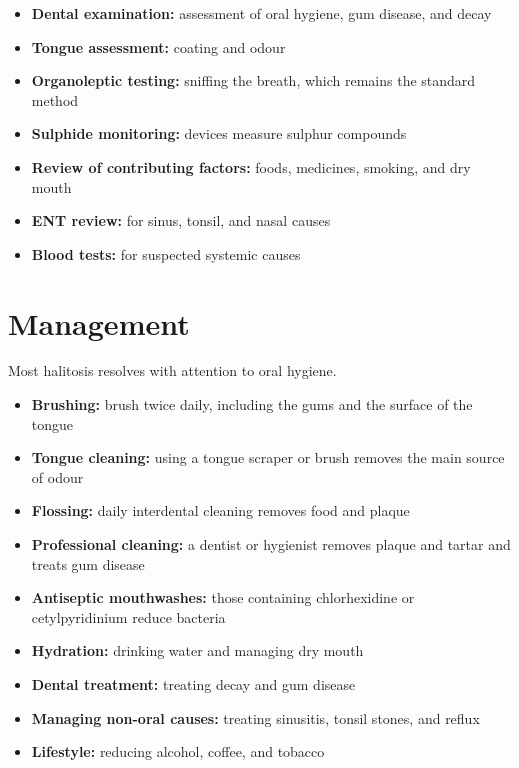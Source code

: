 \begin{itemize}
    \item \textbf{Dental examination:} assessment of oral hygiene, gum disease, and decay
    \item \textbf{Tongue assessment:} coating and odour
    \item \textbf{Organoleptic testing:} sniffing the breath, which remains the standard method
    \item \textbf{Sulphide monitoring:} devices measure sulphur compounds
    \item \textbf{Review of contributing factors:} foods, medicines, smoking, and dry mouth
    \item \textbf{ENT review:} for sinus, tonsil, and nasal causes
    \item \textbf{Blood tests:} for suspected systemic causes
\end{itemize}

\section*{Management}
Most halitosis resolves with attention to oral hygiene.

\begin{itemize}
    \item \textbf{Brushing:} brush twice daily, including the gums and the surface of the tongue
    \item \textbf{Tongue cleaning:} using a tongue scraper or brush removes the main source of odour
    \item \textbf{Flossing:} daily interdental cleaning removes food and plaque
    \item \textbf{Professional cleaning:} a dentist or hygienist removes plaque and tartar and treats gum disease
    \item \textbf{Antiseptic mouthwashes:} those containing chlorhexidine or cetylpyridinium reduce bacteria
    \item \textbf{Hydration:} drinking water and managing dry mouth
    \item \textbf{Dental treatment:} treating decay and gum disease
    \item \textbf{Managing non-oral causes:} treating sinusitis, tonsil stones, and reflux
    \item \textbf{Lifestyle:} reducing alcohol, coffee, and tobacco
\end{itemize}

